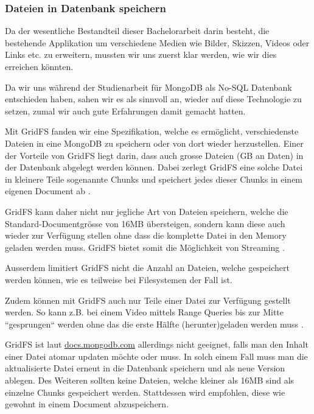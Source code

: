 \subsubsection{Dateien in Datenbank speichern}
Da der wesentliche Bestandteil dieser Bachelorarbeit darin besteht, die bestehende Applikation um verschiedene Medien wie Bilder, Skizzen, Videos oder Links etc. zu erweitern, mussten wir uns zuerst klar werden, wie wir dies erreichen könnten.

Da wir uns während der Studienarbeit \cite{methode635-sa} für MongoDB als No-SQL Datenbank entschieden haben, sahen wir es als sinnvoll an, wieder auf diese Technologie zu setzen, zumal wir auch gute Erfahrungen damit gemacht hatten.

Mit GridFS \cite{gridfs-mongodb}\cite{gridfs-mongodb-async-driver} fanden wir eine Spezifikation, welche es ermöglicht, verschiedenste Dateien in eine MongoDB zu speichern oder von dort wieder herzustellen. Einer der Vorteile von GridFS liegt darin, dass auch grosse Dateien (GB an Daten) in der Datenbank abgelegt werden können. Dabei zerlegt GridFS eine solche Datei in kleinere Teile sogenannte Chunks und speichert jedes dieser Chunks in einem eigenen Document ab \cite{gridfs-mongodb}.

GridFS kann daher nicht nur jegliche Art von Dateien speichern, welche die Standard-Documentgrösse von 16MB übersteigen, sondern kann diese auch wieder zur Verfügung stellen ohne dass die komplette Datei in den Memory geladen werden muss. GridFS bietet somit die Möglichkeit von Streaming \cite{gridfs-chunking}.

Ausserdem limitiert GridFS nicht die Anzahl an Dateien, welche gespeichert werden können, wie es teilweise bei Filesystemen der Fall ist.

Zudem können mit GridFS auch nur Teile einer Datei zur Verfügung gestellt werden. So kann z.B. bei einem Video mittels Range Queries bis zur Mitte ``gesprungen`` werden ohne das die erste Hälfte (herunter)geladen werden muss \cite{gridfs-mongodb}.

GridFS ist laut \href{https://docs.mongodb.com/manual/core/gridfs/}{docs.mongodb.com} allerdings nicht geeignet, falls man den Inhalt einer Datei atomar updaten möchte oder muss. In solch einem Fall muss man die aktualisierte Datei erneut in die Datenbank speichern und als neue Version ablegen. Des Weiteren sollten keine Dateien, welche kleiner als 16MB sind als einzelne Chunks gespeichert werden. Stattdessen wird empfohlen, diese wie gewohnt in einem Document abzuspeichern.

